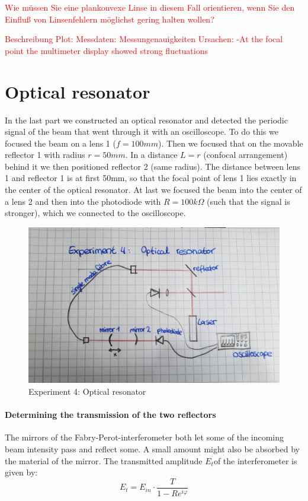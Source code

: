 \documentclass{article}
\begin{document}
\textcolor{red}{
Wie müssen Sie eine plankonvexe Linse in diesem Fall orientieren, wenn Sie den Einfluß von Linsenfehlern möglichst gering halten wollen?}

\textcolor{red}{
Beschreibung Plot:
Messdaten:
Messungenauigkeiten Ursachen:
-At the focal point the multimeter display showed strong fluctuations}

\section{Optical resonator}

In the last part we constructed an optical resonator and detected the periodic signal of the beam that went through it with an oscilloscope. To do this we focused the beam on a lens 1 ($f=100mm$). Then we focused that on the movable reflector 1 with radius $r = 50mm$. In a distance $L=r$ (confocal arrangement) behind it we then positioned reflector 2 (same radius). The distance between lens 1 and reflector 1 is at first 50mm, so that the focal point of lens 1 lies exactly in the center of the optical resonator. At last we focused the beam into the center of a lens 2 and then into the photodiode with $R=100k\Omega$ (such that the signal is stronger), which we connected to the oscilloscope.

\begin{figure}
\includegraphics[width=\textwidth]{Tv4Aufbau.jpg}
\caption{Experiment 4: Optical resonator}
\label{TV4Aufbau}
\end{figure}


\paragraph{Determining the transmission of the two reflectors}
The mirrors of the Fabry-Perot-interferometer both let some of the incoming beam intensity pass and reflect some. A small amount might also be absorbed by the material of the mirror. The transmitted amplitude $E_{t}$of the interferometer is given by:
\begin{equation}
E_{t} = E_{in}\cdot \frac{T}{1-Re^{i\varphi}}
\end{equation}
\end{document}

